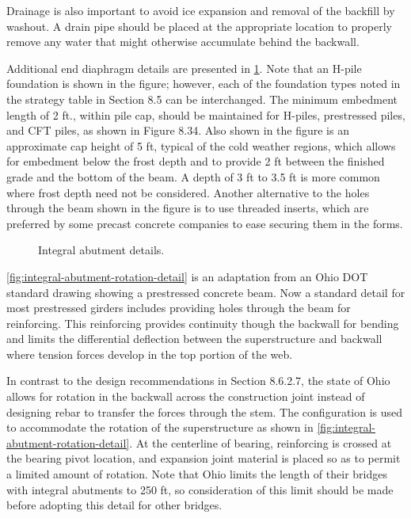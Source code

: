 Drainage is also important to avoid ice expansion and removal of the backfill by washout. A drain pipe should be
placed at the appropriate location to properly remove any water that might otherwise accumulate behind the backwall.

Additional end diaphragm details are presented in \cref{fig:integral-abutment-details}. Note that an H-pile foundation is shown in the
figure; however, each of the foundation types noted in the strategy table in Section 8.5 can be interchanged. The
minimum embedment length of 2 ft., within pile cap, should be maintained for H-piles, prestressed piles, and CFT
piles, as shown in Figure 8.34. Also shown in the figure is an approximate cap height of 5 ft, typical of the cold
weather regions, which allows for embedment below the frost depth and to provide 2 ft between the finished grade
and the bottom of the beam. A depth of 3 ft to 3.5 ft is more common where frost depth need not be considered.
Another alternative to the holes through the beam shown in the figure is to use threaded inserts, which are preferred
by some precast concrete companies to ease securing them in the forms.

\begin{figure}
  \caption{Integral abutment details.}
  \label{fig:integral-abutment-details}
\end{figure}

\cref{fig:integral-abutment-rotation-detail} is an adaptation from an Ohio DOT standard drawing showing a prestressed concrete beam. Now a
standard detail for most prestressed girders includes providing holes through the beam for reinforcing.
 This
reinforcing provides continuity though the backwall for bending and limits the differential deflection between the
superstructure and backwall where tension forces develop in the top portion of the web.

In contrast to the design recommendations in Section 8.6.2.7, the state of Ohio allows for rotation in the backwall
across the construction joint instead of designing rebar to transfer the forces through the stem. The configuration is
used to accommodate the rotation of the superstructure as shown in \cref{fig:integral-abutment-rotation-detail}. At the centerline of bearing,
reinforcing is crossed at the bearing pivot location, and expansion joint material is placed so as to permit a limited
amount of rotation.
 Note that Ohio limits the length of their bridges with integral abutments to 250 ft, so
consideration of this limit should be made before adopting this detail for other bridges.

